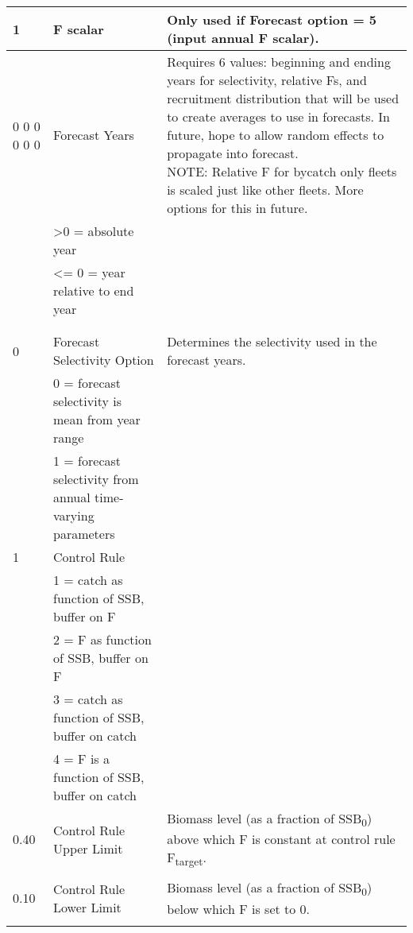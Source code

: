 \begin{landscape}
{\begin{longtable}{p{3.2cm} p{7cm} p{10.8cm}}
  \hline
  1 & F scalar & \multirow{1}{1cm}[-0.10cm]{\parbox{11cm}{Only used if Forecast option = 5 (input annual F scalar).}}\Tstrut\Bstrut\\
  
  \hline
  0 0 0 0 0 0 & Forecast Years &  \multirow{1}{1cm}[-0.25cm]{\parbox{11cm}{Requires 6 values: beginning and ending years for selectivity, relative Fs, and recruitment distribution that will be used to create averages to use in forecasts.  In future, hope to allow random effects to propagate into forecast.  \\NOTE:  Relative F for bycatch only fleets is scaled just like other fleets.  More options for this in future.}}\Tstrut\\
    & >0 = absolute year & \\
    & <= 0 = year relative to end year & \\
    & & \\ 
    & & \Bstrut\\  

 \pagebreak   
 0 & Forecast Selectivity Option & Determines the selectivity used in the forecast years. \Tstrut\\
   & 0 = forecast selectivity is mean from year range & \\
   & 1 = forecast selectivity from annual time-varying parameters & \Bstrut\\

 \hline   
 1 & Control Rule & \Tstrut\\
   & 1 = catch as function of SSB, buffer on F & \\
   & 2 = F as function of SSB, buffer on F & \\
   & 3 = catch as function of SSB, buffer on catch & \\
   & 4 = F is a function of SSB, buffer on catch & \Bstrut\\
 \hline
 
 0.40 \Tstrut & Control Rule Upper Limit & \multirow{1}{1cm}[-0.25cm]{\parbox{11cm}{Biomass level (as a fraction of SSB\textsubscript{0}) above which F is constant at control rule F\textsubscript{target}.}} \\
   &  & \Bstrut\\
 
 \hline
 0.10 \Tstrut & Control Rule Lower Limit & \multirow{1}{1cm}[-0.25cm]{\parbox{11cm}{Biomass level (as a fraction of SSB\textsubscript{0}) below which F is set to 0.}} \\
   &  & \Bstrut\\
 

\end{longtable}}
\end{landscape}
